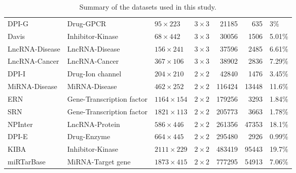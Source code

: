 \documentclass[sn-mathphys-num]{sn-jnl}%
\theoremstyle{thmstyleone}%
\theoremstyle{thmstyletwo}%
\theoremstyle{thmstylethree}%
\begin{document}
\begin{table}[ht]
\begin{tabular}{llllrrl}
DPI-G & Drug-GPCR & $95 \times 223$ & $3 \times 3$ & 21185 & 635 & 3\% \\
Davis & Inhibitor-Kinase & $68 \times 442$ & $3 \times 3$ & 30056 & 1506 & 5.01\% \\
LncRNA-Disease & LncRNA-Disease & $156 \times 241$ & $3 \times 3$ & 37596 & 2485 & 6.61\% \\
LncRNA-Cancer & LncRNA-Cancer & $367 \times 106$ & $3 \times 3$ & 38902 & 2836 & 7.29\% \\
DPI-I & Drug-Ion channel & $204 \times 210$ & $2 \times 2$ & 42840 & 1476 & 3.45\% \\
MiRNA-Disease & MiRNA-Disease & $462 \times 252$ & $2 \times 2$ & 116424 & 13448 & 11.6\% \\
ERN & Gene-Transcription factor & $1164 \times 154$ & $2 \times 2$ & 179256 & 3293 & 1.84\% \\
SRN & Gene-Transcription factor & $1821 \times 113$ & $2 \times 2$ & 205773 & 3663 & 1.78\% \\
NPInter & LncRNA-Protein & $586 \times 446$ & $2 \times 2$ & 261356 & 47353 & 18.1\% \\
DPI-E & Drug-Enzyme & $664 \times 445$ & $2 \times 2$ & 295480 & 2926 & 0.99\% \\
KIBA & Inhibitor-Kinase & $2111 \times 229$ & $2 \times 2$ & 483419 & 95443 & 19.7\% \\
miRTarBase & MiRNA-Target gene & $1873 \times 415$ & $2 \times 2$ & 777295 & 54913 & 7.06\% \\
\bottomrule
\end{tabular}
\caption{Summary of the datasets used in this study. }
\label{tab:datasets}
\end{table}
\end{document}
